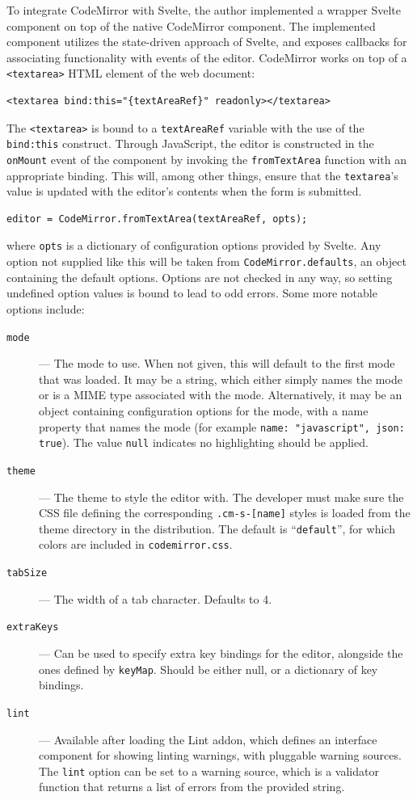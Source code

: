 \documentclass[english,bachelors,forcepolishlogotype]{wizthesis}
\begin{document}
To integrate CodeMirror with Svelte, the author implemented a wrapper Svelte
component on top of the native CodeMirror component. The implemented component
utilizes the state-driven approach of Svelte, and exposes callbacks for
associating functionality with events of the editor. CodeMirror works on top of
a \texttt{<textarea>} HTML element of the web document:
\begin{verbatim}
<textarea bind:this="{textAreaRef}" readonly></textarea>
\end{verbatim}
The \texttt{<textarea>} is bound to a \texttt{textAreaRef} variable with the use
of the \texttt{bind:this} construct. Through JavaScript, the editor is
constructed in the \texttt{onMount} event of the component by invoking the
\texttt{fromTextArea} function with an appropriate binding. This will, among
other things, ensure that the \texttt{textarea}'s value is updated with the
editor's contents when the form is submitted.
\begin{verbatim}
editor = CodeMirror.fromTextArea(textAreaRef, opts);
\end{verbatim}
where \texttt{opts} is a dictionary of configuration options provided by Svelte.
Any option not supplied like this will be taken from
\texttt{CodeMirror.defaults}, an object containing the default options. Options
are not checked in any way, so setting undefined option values is bound to lead
to odd errors. Some more notable options include:
\begin{description}
  \item[\texttt{mode}] --- The mode to use. When not given, this will default to
  the first mode that was loaded. It may be a string, which either simply names
  the mode or is a MIME type associated with the mode. Alternatively, it may be
  an object containing configuration options for the mode, with a name property
  that names the mode (for example \texttt{{name: "javascript", json: true}}).
  The value \texttt{null} indicates no highlighting should be applied.
  \item[\texttt{theme}] --- The theme to style the editor with. The developer
  must make sure the CSS file defining the corresponding \texttt{.cm-s-[name]}
  styles is loaded from the theme directory in the distribution. The default is
  ``\texttt{default}'', for which colors are included in
  \texttt{codemirror.css}.
  \item[\texttt{tabSize}] --- The width of a tab character. Defaults to 4.
  \item[\texttt{extraKeys}] --- Can be used to specify extra key bindings for
  the editor, alongside the ones defined by \texttt{keyMap}. Should be either
  null, or a dictionary of key bindings.
  \item[\texttt{lint}] --- Available after loading the Lint addon, which defines
  an interface component for showing linting warnings, with pluggable warning
  sources. The \texttt{lint} option can be set to a warning source, which is a
  validator function that returns a list of errors from the provided string.
\end{description}
\end{document}
